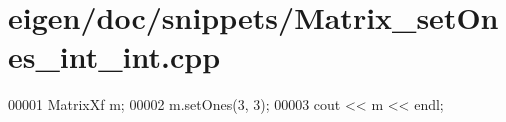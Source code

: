 \hypertarget{eigen_2doc_2snippets_2_matrix__set_ones__int__int_8cpp_source}{}\section{eigen/doc/snippets/\+Matrix\+\_\+set\+Ones\+\_\+int\+\_\+int.cpp}
\label{eigen_2doc_2snippets_2_matrix__set_ones__int__int_8cpp_source}

\begin{DoxyCode}
00001 MatrixXf m;
00002 m.setOnes(3, 3);
00003 cout << m << endl;
\end{DoxyCode}
